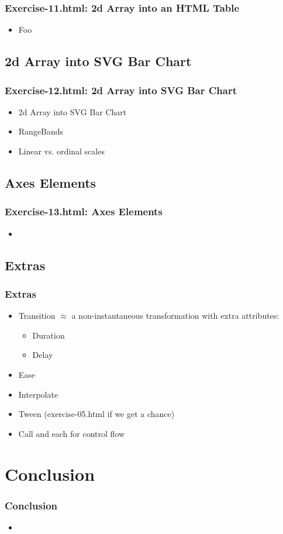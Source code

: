 \documentclass{beamer}
\begin{document}
\begin{frame}
    \frametitle{Exercise-11.html: 2d Array into an HTML Table}
    \begin{itemize}
    \item Foo
    \end{itemize}
\end{frame}



\subsection{2d Array into SVG Bar Chart}

\begin{frame}
    \frametitle{Exercise-12.html: 2d Array into SVG Bar Chart}
    \begin{itemize}
    \item 2d Array into SVG Bar Chart
    \item RangeBands
    \item Linear vs. ordinal scales
    \end{itemize}
\end{frame}



\subsection{Axes Elements}

\begin{frame}
    \frametitle{Exercise-13.html: Axes Elements}
    \begin{itemize}
    \item 
    \end{itemize} 
\end{frame}



\subsection{Extras}

\begin{frame}
    \frametitle{Extras}
    \begin{itemize}
    \item Transition $\approx$ a non-instantaneous transformation with extra attributes:
        \begin{itemize}
        \item Duration
        \item Delay
        \end{itemize}
    \item Ease
    \item Interpolate
    \item Tween (exercise-05.html if we get a chance)
    \item Call and each for control flow 
    \end{itemize}
\end{frame}



\section{Conclusion}

\begin{frame}
    \frametitle{Conclusion}
    \begin{itemize}
    \item 
    \end{itemize}
\end{frame}
\end{document}
